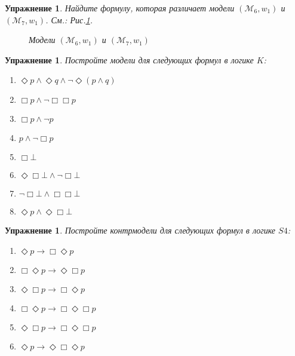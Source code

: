 \documentclass[11pt]{article}
\newtheorem{exercise}[theorem]{Упражнение}
\newcommand{\M}{\mathcal{M}}
\begin{document}
\begin{exercise} Найдите формулу, которая различает модели $(\M_6, w_1)$ и $(\M_7, w_1)$. См.: Рис.\ref{fig:5}.
\begin{figure}[hbt] \caption{Модели $(\M_6,w_1)$ и $(\M_7, w_1)$} \label{fig:5} 	
\begin{multicols}{2}
\end{multicols}	
\end{figure}
\end{exercise}

\begin{exercise}
Постройте модели для следующих формул в логике $K$:
\begin{multicols}{2}
\begin{enumerate}
	\item $\Diamond p \wedge \Diamond q \wedge \neg \Diamond (p \wedge q)$
	\item $\Box p \wedge \neg \Box \Box p$
	\item $\Box p \wedge \neg p$
	\item $p \wedge \neg \Box p$
	\item $\Box \bot$
	\item $\Diamond \Box \bot \wedge \neg \Box \bot$
	\item $\neg \Box \bot \wedge \Box \Box \bot$
	\item $\Diamond p \wedge \Diamond \Box \bot$
\end{enumerate}
\end{multicols}	
\end{exercise}

\begin{exercise} Постройте контрмодели для следующих формул в логике $S4$:
\begin{multicols}{2}
	\begin{enumerate}
		\item $\Diamond p \to \Box \Diamond p$
		\item $\Box \Diamond p \to \Diamond \Box p$
		\item $\Diamond \Box p \to \Box \Diamond p$
		\item $\Box \Diamond p  \to \Box \Diamond \Box p$
	    \item $\Diamond \Box p  \to \Box \Diamond \Box p$
		\item $\Diamond p \to \Diamond \Box \Diamond p$
	\end{enumerate}
\end{multicols}
\end{exercise}
\end{document}
